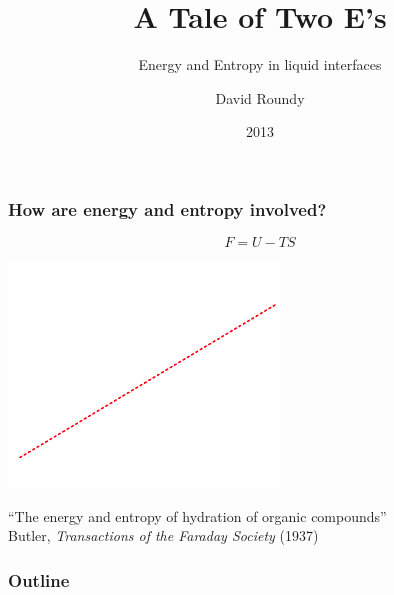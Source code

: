 \documentclass{beamer}
\title{A Tale of Two E's}
\subtitle{Energy and Entropy in liquid interfaces}
\author{David Roundy}
\date{2013}
\newcommand\mycite[3]{{\small #1, \textit{#2} (#3)}}
\begin{document}
{
\begin{frame}
  \titlepage

\end{frame}
}

\begin{frame}
  \frametitle{How are energy and entropy involved?}
  \vspace{-1em}
  \[F = U - TS\]
  \begin{center}
    \includegraphics[height=6cm]{figs/hydration-plot-nice}
  \end{center}
  ``The energy and entropy of hydration of organic compounds''
  \\ \hfill \mycite{Butler}{Transactions of the Faraday Society}{1937}
\end{frame}

\begin{frame}
  \frametitle{Outline}
  \tableofcontents
\end{frame}








\end{document}
